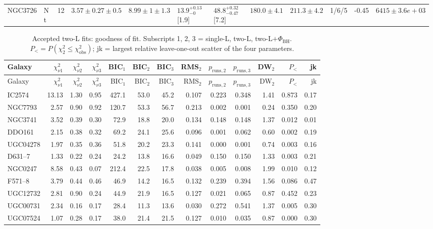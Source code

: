 \documentclass[10pt]{article}
\begin{document}
\begin{landscape}
{\begin{longtable}{llrlllllrrrr}
NGC3726 & N t & 12 & $3.57\pm0.27\pm0.5$ & $8.99\pm1\pm1.3$ & $13.9^{+0.13}_{-0}$ [1.9] & $48.8^{+0.32}_{-0.47}$ [7.2] & $180.0\pm4.1$ & $211.3\pm4.2$ & 1/6/5 & -0.45 & $6415\pm3.6e+03$\\
\end{longtable}
\begin{longtable}{lrrrrrrrrrrrr}
\caption{Accepted two-L fits: goodness of fit. Subscripts 1, 2, 3 = single-L, two-L, two-L$+\Phi_\mathrm{BH}$. $P_<=P(\chi^2_2\le\chi^2_\mathrm{obs})$; jk = largest relative leave-one-out scatter of the four parameters.}\\\toprule
Galaxy & $\chi^2_{\nu1}$ & $\chi^2_{\nu2}$ & $\chi^2_{\nu3}$ & BIC$_1$ & BIC$_2$ & BIC$_3$ & RMS$_2$ & $p_\mathrm{runs,2}$ & $p_\mathrm{runs,3}$ & DW$_2$ & $P_<$ & jk\\\midrule\endfirsthead
\toprule Galaxy & $\chi^2_{\nu1}$ & $\chi^2_{\nu2}$ & $\chi^2_{\nu3}$ & BIC$_1$ & BIC$_2$ & BIC$_3$ & RMS$_2$ & $p_\mathrm{runs,2}$ & $p_\mathrm{runs,3}$ & DW$_2$ & $P_<$ & jk\\\midrule\endhead\bottomrule\endfoot
IC2574 & 13.13 & 1.30 & 0.95 & 427.1 & 53.0 & 45.2 & 0.107 & 0.223 & 0.348 & 1.41 & 0.873 & 0.17\\
NGC7793 & 2.57 & 0.90 & 0.92 & 120.7 & 53.3 & 56.7 & 0.213 & 0.002 & 0.001 & 0.24 & 0.350 & 0.20\\
NGC3741 & 3.52 & 0.39 & 0.30 & 72.9 & 18.8 & 20.0 & 0.134 & 0.148 & 0.148 & 1.37 & 0.012 & 0.01\\
DDO161 & 2.15 & 0.38 & 0.32 & 69.2 & 24.1 & 25.6 & 0.096 & 0.001 & 0.062 & 0.60 & 0.002 & 0.19\\
UGC04278 & 1.97 & 0.35 & 0.36 & 51.8 & 20.2 & 23.3 & 0.141 & 0.000 & 0.001 & 0.74 & 0.003 & 0.16\\
D631--7 & 1.33 & 0.22 & 0.24 & 24.2 & 13.8 & 16.6 & 0.049 & 0.150 & 0.150 & 1.33 & 0.003 & 0.21\\
NGC0247 & 8.58 & 0.43 & 0.07 & 212.4 & 22.5 & 17.8 & 0.038 & 0.005 & 0.008 & 1.99 & 0.010 & 0.12\\
F571--8 & 3.79 & 0.44 & 0.46 & 46.9 & 14.2 & 16.5 & 0.132 & 0.239 & 0.394 & 1.56 & 0.086 & 0.47\\
UGC12732 & 2.81 & 0.90 & 0.24 & 44.9 & 21.9 & 16.5 & 0.127 & 0.021 & 0.065 & 0.87 & 0.452 & 0.23\\
UGC00731 & 2.34 & 0.16 & 0.17 & 28.4 & 11.3 & 13.6 & 0.030 & 0.272 & 0.541 & 1.37 & 0.005 & 0.30\\
UGC07524 & 1.07 & 0.28 & 0.17 & 38.0 & 21.4 & 21.5 & 0.127 & 0.010 & 0.035 & 0.87 & 0.000 & 0.30\\

\end{longtable}}
\end{landscape}
\end{document}
